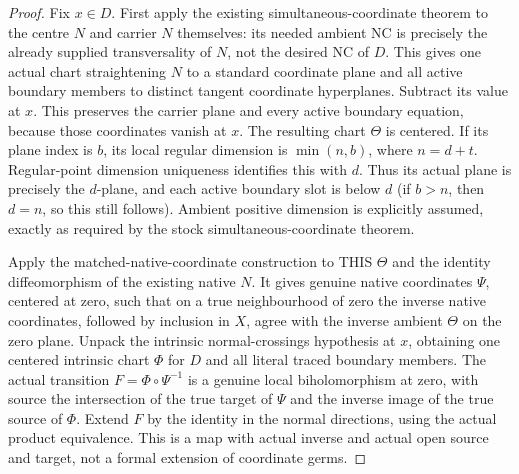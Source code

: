 \begin{proof}
Fix $x\in D$. First apply the existing simultaneous-coordinate theorem to
the centre $N$ and carrier $N$ themselves: its needed ambient NC is precisely
the already supplied transversality of $N$, not the desired NC of $D$.
This gives one actual chart straightening $N$ to a standard coordinate plane
and all active boundary members to distinct tangent coordinate hyperplanes.
Subtract its value at $x$. This preserves the carrier plane and every active
boundary equation, because those coordinates vanish at $x$. The resulting
chart $\Theta$ is centered. If its plane index is $b$, its local regular
dimension is $\min(n,b)$, where $n=d+t$. Regular-point dimension uniqueness
identifies this with $d$. Thus its actual plane is precisely the $d$-plane,
and each active boundary slot is below $d$ (if $b>n$, then $d=n$, so this
still follows). Ambient positive dimension is explicitly assumed, exactly
as required by the stock simultaneous-coordinate theorem.

Apply the matched-native-coordinate construction to THIS $\Theta$ and the
identity diffeomorphism of the existing native $N$. It gives genuine native
coordinates $\Psi$, centered at zero, such that on a true neighbourhood of
zero the inverse native coordinates, followed by inclusion in $X$, agree
with the inverse ambient $\Theta$ on the zero plane. Unpack the intrinsic
normal-crossings hypothesis at $x$, obtaining one centered intrinsic chart
$\Phi$ for $D$ and all literal traced boundary members. The actual transition
$F=\Phi\circ\Psi^{-1}$ is a genuine local biholomorphism at zero, with source
the intersection of the true target of $\Psi$ and the inverse image of the
true source of $\Phi$. Extend $F$ by the identity in the normal directions,
using the actual product equivalence. This is a map with actual inverse and
actual open source and target, not a formal extension of coordinate germs.


\end{proof}
